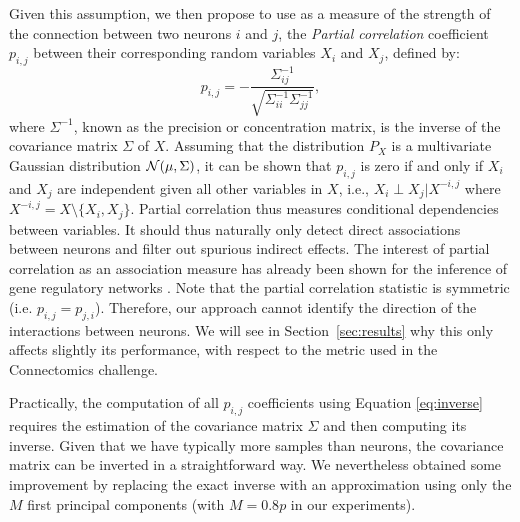 \documentclass[wcp]{jmlr}
\begin{document}
Given this assumption, we then propose to use as a measure of the
strength of the connection between two neurons $i$ and $j$, the
\textit{Partial correlation} coefficient $p_{i,j}$ between their corresponding
random variables $X_i$ and $X_j$, defined by:
\begin{equation}
p_{i,j} =
-\frac{\Sigma^{-1}_{ij}}{\sqrt{\Sigma^{-1}_{ii} \Sigma^{-1}_{jj}}}, \label{eq:inverse}
\end{equation}
where $\Sigma^{-1}$, known as the precision or concentration matrix, is the inverse of the covariance matrix $\Sigma$ of $X$. %
Assuming that the distribution $P_X$ is a multivariate Gaussian
distribution ${\cal N}(\mu,\Sigma)$, it can be shown that $p_{i,j}$ is
zero if and only if $X_i$ and $X_j$ are independent given all other
variables in $X$, i.e., $X_i \perp X_j|X^{-i,j}$ where $X^{-i,j}= X
\setminus\{X_i,X_j\}$. Partial correlation thus measures conditional
dependencies between variables. It should thus naturally only detect direct associations
between neurons and filter out spurious indirect effects. The interest
of partial correlation as an association measure has already been
shown for the inference of gene regulatory networks
\citep{de2004discovery,Schafer:2005}.
Note that the partial correlation statistic is symmetric
(i.e. $p_{i,j}=p_{j,i}$). Therefore, our approach cannot identify the
direction of the interactions between neurons. We will see in
Section~\ref{sec:results} why this only affects slightly its
performance, with respect to the metric used in the Connectomics
challenge.

Practically, the computation of all $p_{i,j}$ coefficients using Equation
\ref{eq:inverse} requires the estimation of the covariance matrix $\Sigma$
and then computing its inverse. Given that we have typically more
samples than neurons, the covariance matrix can be inverted in a
straightforward way. We nevertheless obtained some improvement by
replacing the exact inverse with an approximation using only the $M$
first principal components \citep{bishop2006pattern} (with
$M=0.8 p$ in our experiments).
\end{document}
